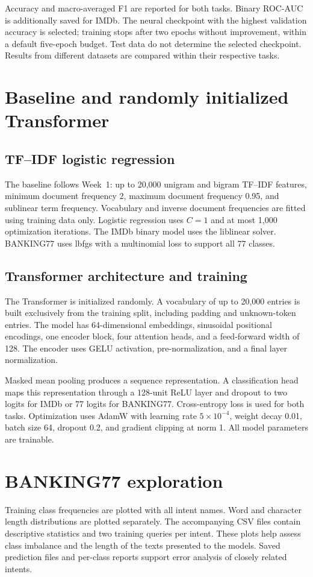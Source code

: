 \documentclass[11pt,a4paper]{article}
\begin{document}
Accuracy and macro-averaged F1 are reported for both tasks. Binary
ROC-AUC is additionally saved for IMDb. The neural checkpoint with the
highest validation accuracy is selected; training stops after two
epochs without improvement, within a default five-epoch budget.
Test data do not determine the selected checkpoint. Results from
different datasets are compared within their respective tasks.

\section{Baseline and randomly initialized Transformer}
\subsection{TF--IDF logistic regression}
The baseline follows Week~1: up to 20,000 unigram and bigram TF--IDF
features, minimum document frequency 2, maximum document frequency
0.95, and sublinear term frequency. Vocabulary and inverse document
frequencies are fitted using training data only.
Logistic regression uses $C=1$ and at most 1,000 optimization iterations.
The IMDb binary model uses the liblinear solver. BANKING77 uses lbfgs
with a multinomial loss to support all 77 classes.

\subsection{Transformer architecture and training}
The Transformer is initialized randomly. A vocabulary of up to 20,000
entries is built exclusively from the training split, including padding
and unknown-token entries. The model has 64-dimensional embeddings,
sinusoidal positional encodings, one encoder block, four attention heads,
and a feed-forward width of 128. The encoder uses GELU activation,
pre-normalization, and a final layer normalization.

Masked mean pooling produces a sequence representation. A classification
head maps this representation through a 128-unit ReLU layer and dropout
to two logits for IMDb or 77 logits for BANKING77.
Cross-entropy loss is used for both tasks.
Optimization uses AdamW with learning rate $5\times10^{-4}$, weight decay
0.01, batch size 64, dropout 0.2, and gradient clipping at norm 1.
All model parameters are trainable.

\section{BANKING77 exploration}
Training class frequencies are plotted with all intent names.
Word and character length distributions are plotted separately.
The accompanying CSV files contain descriptive statistics and two
training queries per intent. These plots help assess class imbalance
and the length of the texts presented to the models.
Saved prediction files and per-class reports support error analysis
of closely related intents.
\end{document}
